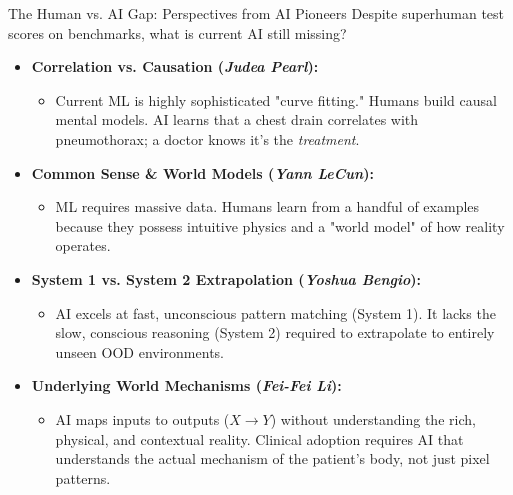 \documentclass[aspectratio=169]{beamer}
\begin{document}
\begin{frame}{The Human vs. AI Gap: Perspectives from AI Pioneers}
    Despite superhuman test scores on benchmarks, what is current AI still missing?
    \vspace{0.2cm}
    \begin{itemize}
        \item \textbf{Correlation vs. Causation (\textit{Judea Pearl}):} 
        \begin{itemize}
            \item Current ML is highly sophisticated "curve fitting." Humans build causal mental models. AI learns that a chest drain correlates with pneumothorax; a doctor knows it's the \textit{treatment}.
        \end{itemize}
        \item \textbf{Common Sense \& World Models (\textit{Yann LeCun}):} 
        \begin{itemize}
            \item ML requires massive data. Humans learn from a handful of examples because they possess intuitive physics and a "world model" of how reality operates.
        \end{itemize}
        \item \textbf{System 1 vs. System 2 Extrapolation (\textit{Yoshua Bengio}):} 
        \begin{itemize}
            \item AI excels at fast, unconscious pattern matching (System 1). It lacks the slow, conscious reasoning (System 2) required to extrapolate to entirely unseen OOD environments.
        \end{itemize}
        \item \textbf{Underlying World Mechanisms (\textit{Fei-Fei Li}):} 
        \begin{itemize}
            \item AI maps inputs to outputs ($X \rightarrow Y$) without understanding the rich, physical, and contextual reality. Clinical adoption requires AI that understands the actual mechanism of the patient's body, not just pixel patterns.
        \end{itemize}
    \end{itemize}
    \vspace{0.1cm}
    
\end{frame}
\end{document}
